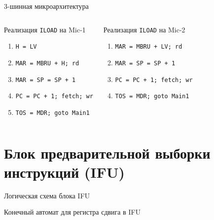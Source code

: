 \begin{frame}{3-шинная микроархитектура}
\small\pause
\begin{columns}
    \column{5.5cm}
    \begin{block}{Реализация \texttt{ILOAD} на Mic-1}
    \pause
    \begin{enumerate}%
        \item \texttt{H = LV}
        \item \texttt{MAR = MBRU + H; rd}
        \item \texttt{MAR = SP = SP + 1}
        \item \texttt{PC = PC + 1; fetch; wr}
        \item \texttt{TOS = MDR; goto Main1}
    \end{enumerate}
    \end{block}

    \pause
    \column{6cm}
    \begin{block}{Реализация \texttt{ILOAD} на Mic-2}
    \begin{enumerate}
        \item \texttt{MAR = MBRU + LV; rd}
        \item \texttt{MAR = SP = SP + 1}
        \item \texttt{PC = PC + 1; fetch; wr}
        \item \texttt{TOS = MDR; goto~Main1}
    \end{enumerate}
    \end{block}
\end{columns}
\end{frame}

\section{Блок предварительной выборки инструкций (IFU)}

\begin{frame}{Логическая схема блока IFU}
\end{frame}

\begin{frame}{Конечный автомат для регистра сдвига в IFU}
\end{frame}

